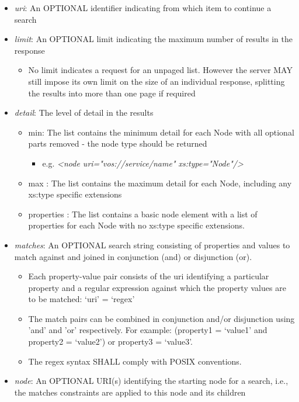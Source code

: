 \documentclass[11pt,a4paper]{ivoa}
\begin{document}
\begin{itemize}
    \item \emph{uri}: An OPTIONAL identifier indicating from which item to continue a search
    \item \emph{limit}: An OPTIONAL limit indicating the maximum number of results in the response
        \begin{itemize}
            \item No limit indicates a request for an unpaged list. However the server MAY still impose its own limit on the size of an individual response, splitting the results into more than one page if required
        \end{itemize}
    \item \emph{detail}: The level of detail in the results
        \begin{itemize}
            \item min: The list contains the minimum detail for each Node with all optional parts removed - the node type should be returned
                \begin{itemize}
                    \item e.g. \emph{<node uri="vos://service/name" xs:type="Node"/>}
                \end{itemize}
            \item max : The list contains the maximum detail for each Node, including any xs:type specific extensions
            \item properties : The list contains a basic node element with a list of properties for each Node with no xs:type specific extensions.
        \end{itemize}
    \item \emph{matches}: An OPTIONAL search string consisting of properties and values to match against and joined in conjunction (and) or disjunction (or).
        \begin{itemize}
            \item Each property-value pair consists of the uri identifying a particular property and a regular expression against which the property values are to be matched: `uri' = `regex'
            \item The match pairs can be combined in conjunction and/or disjunction using 'and' and 'or' respectively. For example: (property1 = `value1' and property2 = `value2') or property3 = `value3'.
            \item The regex syntax SHALL comply with POSIX conventions.
        \end{itemize}
    \item \emph{node}: An OPTIONAL URI(s) identifying the starting node for a search, i.e., the matches constraints are applied to this node and its children
\end{itemize}
\end{document}
